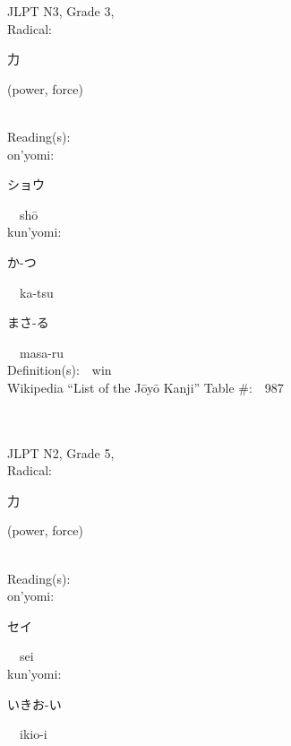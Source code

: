 \begin{multicols}{2}
{JLPT N3, Grade 3, \\Radical:\ \ {\begin{CJK}{UTF8}{min} 力 \end{CJK}} (power, force) } \\
Reading(s):\ \ \\
{\hspace*{1em}}on'yomi:\ \ \\
{\hspace*{2em}}{\begin{CJK}{UTF8}{min} ショウ \end{CJK}}\ \ sh\=o\ \ \\
{\hspace*{1em}}kun'yomi:\ \ \\
{\hspace*{2em}}{\begin{CJK}{UTF8}{min} か-つ \end{CJK}}\ \ ka-tsu\ \ \\
{\hspace*{2em}}{\begin{CJK}{UTF8}{min} まさ-る \end{CJK}}\ \ masa-ru\ \ \\
Definition(s):\ \ win \\
Wikipedia ``List of the J\=oy\=o Kanji'' Table \#:\ \ 987 \\
\ \ \\
{\fontsize{34pt}{40pt}  }\ \ \\  %
{JLPT N2, Grade 5, \\Radical:\ \ {\begin{CJK}{UTF8}{min} 力 \end{CJK}} (power, force) } \\
Reading(s):\ \ \\
{\hspace*{1em}}on'yomi:\ \ \\
{\hspace*{2em}}{\begin{CJK}{UTF8}{min} セイ \end{CJK}}\ \ sei\ \ \\
{\hspace*{1em}}kun'yomi:\ \ \\
{\hspace*{2em}}{\begin{CJK}{UTF8}{min} いきお-い \end{CJK}}\ \ ikio-i\ \ \\

\end{multicols}
